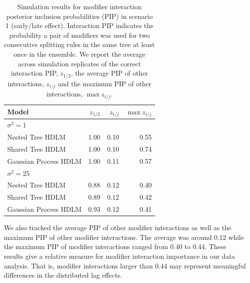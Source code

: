 \documentclass[12pt]{article}
\begin{document}
\begin{table}[!ht]
\footnotesize
    \centering
    \caption{Simulation results for modifier interaction posterior inclusion probabilities (PIP) in scenario 1 (early/late effect). Interaction PIP indicates the probability a pair of modifiers was used for two consecutive splitting rules in the same tree at least once in the ensemble. We report the average across simulation replicates of the correct interaction PIP, $z_{1/2}$, the average PIP of other interactions, $z_{i/j}$ and the maximum PIP of other interactions, $\max z_{i/j}$.}\vspace{6pt}
    \label{tab:scen1_inc2}
    \begin{tabular}{lrrr}
        \toprule[2pt]
        Model & $z_{1/2}$ & $z_{i/j}$ & $\max z_{i/j}$\\
        \midrule
        \multicolumn{4}{l}{$\sigma^2=1$}\\
Nested Tree HDLM & 1.00 & 0.10 & 0.55\\
Shared Tree HDLM & 1.00 & 0.10 & 0.74\\
Gaussian Process HDLM & 1.00 & 0.11 & 0.57\\


        \midrule
        \multicolumn{4}{l}{$\sigma^2=25$}\\
Nested Tree HDLM & 0.88 & 0.12 & 0.40\\
Shared Tree HDLM & 0.89 & 0.12 & 0.42\\
Gaussian Process HDLM & 0.93 & 0.12 & 0.41\\

        \bottomrule[2pt]
    \end{tabular}
\end{table}


We also tracked the average PIP of other modifier interactions as well as the maximum PIP of other modifier interactions. The average was around 0.12 while the maximum PIP of modifier interactions ranged from 0.40 to 0.44. These results give a relative measure for modifier interaction importance in our data analysis. That is, modifier interactions larger than 0.44 may represent meaningful differences in the distributed lag effects.
\end{document}

